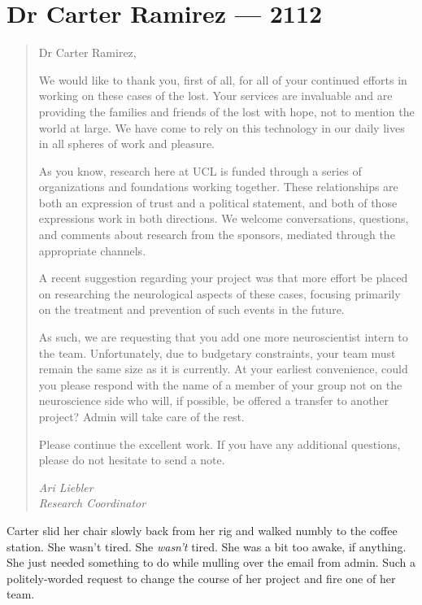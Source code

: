 \hypertarget{dr-carter-ramirez-2112}{%
\chapter*{Dr Carter Ramirez — 2112}\label{dr-carter-ramirez-2112}}

\begin{quote}
Dr Carter Ramirez,

We would like to thank you, first of all, for all of your continued efforts in working on these cases of the lost. Your services are invaluable and are providing the families and friends of the lost with hope, not to mention the world at large. We have come to rely on this technology in our daily lives in all spheres of work and pleasure.

As you know, research here at UCL is funded through a series of organizations and foundations working together. These relationships are both an expression of trust and a political statement, and both of those expressions work in both directions. We welcome conversations, questions, and comments about research from the sponsors, mediated through the appropriate channels.

A recent suggestion regarding your project was that more effort be placed on researching the neurological aspects of these cases, focusing primarily on the treatment and prevention of such events in the future.

As such, we are requesting that you add one more neuroscientist intern to the team. Unfortunately, due to budgetary constraints, your team must remain the same size as it is currently. At your earliest convenience, could you please respond with the name of a member of your group not on the neuroscience side who will, if possible, be offered a transfer to another project? Admin will take care of the rest.

Please continue the excellent work. If you have any additional questions, please do not hesitate to send a note.

\emph{Ari Liebler}\\
\emph{Research Coordinator}
\end{quote}

Carter slid her chair slowly back from her rig and walked numbly to the coffee station. She wasn't tired. She \emph{wasn't} tired. She was a bit too awake, if anything. She just needed something to do while mulling over the email from admin. Such a politely-worded request to change the course of her project and fire one of her team.

